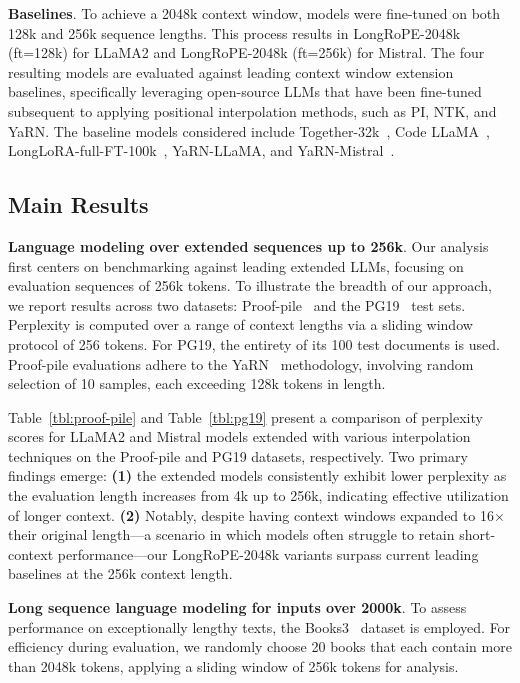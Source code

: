 \textbf{Baselines}. To achieve a 2048k context window, models were fine-tuned on both 128k and 256k sequence lengths. This process results in LongRoPE-2048k (ft=128k) for LLaMA2 and LongRoPE-2048k (ft=256k) for Mistral. The four resulting models are evaluated against leading context window extension baselines, specifically leveraging open-source LLMs that have been fine-tuned subsequent to applying positional interpolation methods, such as PI, NTK, and YaRN. The baseline models considered include Together-32k~\cite{together}, Code LLaMA~\cite{codellama}, LongLoRA-full-FT-100k~\cite{longlora}, YaRN-LLaMA, and YaRN-Mistral~\cite{yarn}.

\subsection{Main Results}

\label{sec:mainresult}
\textbf{Language modeling over extended sequences up to 256k}. Our analysis first centers on benchmarking against leading extended LLMs, focusing on evaluation sequences of 256k tokens. To illustrate the breadth of our approach, we report results across two datasets: Proof-pile~\cite{pg19} and the PG19~\cite{pile} test sets. Perplexity is computed over a range of context lengths via a sliding window protocol of 256 tokens. For PG19, the entirety of its 100 test documents is used. Proof-pile evaluations adhere to the YaRN~\cite{yarn} methodology, involving random selection of 10 samples, each exceeding 128k tokens in length.

Table~\ref{tbl:proof-pile} and Table~\ref{tbl:pg19} present a comparison of perplexity scores for LLaMA2 and Mistral models extended with various interpolation techniques on the Proof-pile and PG19 datasets, respectively. Two primary findings emerge: \textbf{(1)} the extended models consistently exhibit lower perplexity as the evaluation length increases from 4k up to 256k, indicating effective utilization of longer context. \textbf{(2)} Notably, despite having context windows expanded to 16$\times$ their original length—a scenario in which models often struggle to retain short-context performance—our LongRoPE-2048k variants surpass current leading baselines at the 256k context length.

\textbf{Long sequence language modeling for inputs over 2000k}. To assess performance on exceptionally lengthy texts, the Books3~\cite{pile} dataset is employed. For efficiency during evaluation, we randomly choose 20 books that each contain more than 2048k tokens, applying a sliding window of 256k tokens for analysis.

